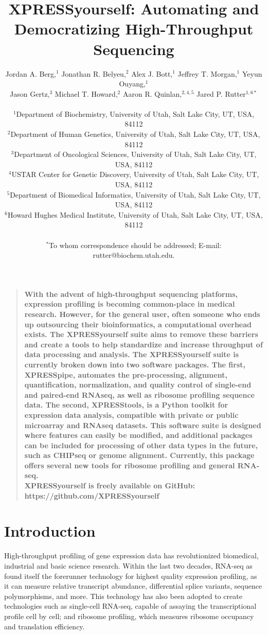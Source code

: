 \documentclass[11pt, a4paper, oneside]{article}
\title{
XPRESSyourself: Automating and Democratizing High-Throughput Sequencing
}
\author
{
Jordan A. Berg,$^{1}$ Jonathan R. Belyeu,$^{2}$ Alex J. Bott,$^{1}$ Jeffrey T. Morgan,$^{1}$ Yeyun Ouyang,$^{1}$\\
Jason Gertz,$^{3}$ Michael T. Howard,$^{2}$ Aaron R. Quinlan,$^{2,4,5}$ Jared P. Rutter$^{1,6\ast}$\\
\\
\normalsize{$^{1}$Department of Biochemistry, University of Utah, Salt Lake City, UT, USA, 84112}\\
\normalsize{$^{2}$Department of Human Genetics, University of Utah, Salt Lake City, UT, USA, 84112}\\
\normalsize{$^{3}$Department of Oncological Sciences, University of Utah, Salt Lake City, UT, USA, 84112}\\
\normalsize{$^{4}$USTAR Center for Genetic Discovery, University of Utah, Salt Lake City, UT, USA, 84112}\\
\normalsize{$^{5}$Department of Biomedical Informatics, University of Utah, Salt Lake City, UT, USA, 84112}\\
\normalsize{$^{6}$Howard Hughes Medical Institute, University of Utah, Salt Lake City, UT, USA, 84112}\\
\\
\normalsize{$^\ast$To whom correspondence should be addressed; E-mail: rutter@biochem.utah.edu.}
}
\date{}
\newenvironment{sciabstract}{%
\begin{quote} \bf}
{\end{quote}}
\begin{document}
\baselineskip24pt

\maketitle




\begin{sciabstract}
  With the advent of high-throughput sequencing platforms, expression profiling is becoming common-place in medical research. However, for the general user, often someone who ends up outsourcing their bioinformatics, a computational overhead exists. The XPRESSyourself suite aims to remove these barriers and create a tools to help standardize and increase throughput of data processing and analysis. The XPRESSyourself suite is currently broken down into two software packages. The first, XPRESSpipe, automates the pre-processing, alignment, quantification, normalization, and quality control of single-end and paired-end RNAseq, as well as ribosome profiling sequence data. The second, XPRESStools, is a Python toolkit for expression data analysis, compatible with private or public microarray and RNAseq datasets. This software suite is designed where features can easily be modified, and additional packages can be included for processing of other data types in the future, such as CHIPseq or genome alignment. Currently, this package offers several new tools for ribosome profiling and general RNA-seq.
  \newline\\
  \normalfont XPRESSyourself is freely available on GitHub: https://github.com/XPRESSyourself\\
\end{sciabstract}


\section{Introduction}

High-throughput profiling of gene expression data has revolutionized biomedical, industrial and basic science research. Within the last two decades, RNA-seq as found itself the forerunner technology for highest quality expression profiling, as it can measure relative transcript abundance, differential splice variants, sequence polymorphisms, and more. This technology has also been adopted to create technologies such as single-cell RNA-seq, capable of assaying the transcriptional profile cell by cell; and ribosome profiling, which measures ribosome occupancy and translation efficiency.
\end{document}
